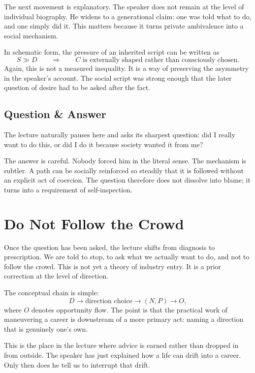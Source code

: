 The next movement is explanatory. The speaker does not remain at the level of individual biography. He widens to a generational claim: one was told what to do, and one simply did it. This matters because it turns private ambivalence into a social mechanism.

In schematic form, the pressure of an inherited script can be written as
\begin{equation}
S \gg D \qquad \Longrightarrow \qquad C \text{ is externally shaped rather than consciously chosen.}
\end{equation}
Again, this is not a measured inequality. It is a way of preserving the asymmetry in the speaker's account. The social script was strong enough that the later question of desire had to be asked after the fact.

\subsection{Question \& Answer}

The lecture naturally pauses here and asks its sharpest question: did I really want to do this, or did I do it because society wanted it from me?

The answer is careful. Nobody forced him in the literal sense. The mechanism is subtler. A path can be socially reinforced so steadily that it is followed without an explicit act of coercion. The question therefore does not dissolve into blame; it turns into a requirement of self-inspection.

\section{Do Not Follow the Crowd}

Once the question has been asked, the lecture shifts from diagnosis to prescription. We are told to stop, to ask what we actually want to do, and not to follow the crowd. This is not yet a theory of industry entry. It is a prior correction at the level of direction.

The conceptual chain is simple:
\begin{equation}
D \longrightarrow \text{direction choice} \longrightarrow (N,P) \longrightarrow O,
\end{equation}
where \(O\) denotes opportunity flow. The point is that the practical work of maneuvering a career is downstream of a more primary act: naming a direction that is genuinely one's own.

This is the place in the lecture where advice is earned rather than dropped in from outside. The speaker has just explained how a life can drift into a career. Only then does he tell us to interrupt that drift.

